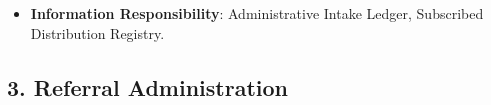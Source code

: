\begin{itemize}
\begin{itemize}
\begin{itemize}
\item 
\emph{Exposed Service}: \texttt{} — Emits change notifications across the HIE.



\end{itemize}


\end{itemize}


\item 
\textbf{Information Responsibility}: Administrative Intake Ledger, Subscribed Distribution Registry.



\end{itemize}
\label{rad:sa:25}

\par\smallskip
{}\label{rad:sa:27}
\subsection*{3. Referral Administration}
\label{rad:sa:28}

